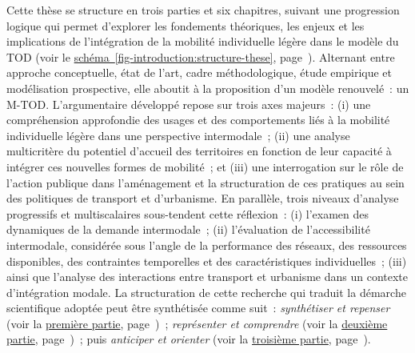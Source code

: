 \begin{refsegment}
Cette thèse se structure en trois parties et six chapitres, suivant une progression logique qui permet d’explorer les fondements théoriques, les enjeux et les implications de l’intégration de la mobilité individuelle légère dans le modèle du \acrshort{TOD} (voir le \hyperref[fig-introduction:structure-these]{schéma~\ref{fig-introduction:structure-these}}, page~\pageref{fig-introduction:structure-these}). Alternant entre approche conceptuelle, état de l’art, cadre méthodologique, étude empirique et modélisation prospective, elle aboutit à la proposition d’un modèle renouvelé~: un \acrfull{M-TOD}. L’argumentaire développé repose sur trois axes majeurs~: (i) une compréhension approfondie des usages et des comportements liés à la mobilité individuelle légère dans une perspective intermodale~; (ii) une analyse multicritère du potentiel d’accueil des territoires en fonction de leur capacité à intégrer ces nouvelles formes de mobilité~; et (iii) une interrogation sur le rôle de l’action publique dans l’aménagement et la structuration de ces pratiques au sein des politiques de transport et d’urbanisme. En parallèle, trois niveaux d’analyse progressifs et multiscalaires sous-tendent cette réflexion~: (i) l’examen des dynamiques de la demande intermodale~; (ii) l’évaluation de l’accessibilité intermodale, considérée sous l’angle de la performance des réseaux, des ressources disponibles, des contraintes temporelles et des caractéristiques individuelles~; (iii) ainsi que l’analyse des interactions entre transport et urbanisme dans un contexte d'intégration modale. La structuration de cette recherche qui traduit la démarche scientifique adoptée peut être synthétisée comme suit~: \textsl{synthétiser et repenser} (voir la \hyperref[part1:titre]{première partie}, page~\pageref{part1:titre})~; \textsl{représenter et comprendre} (voir la \hyperref[part2:titre]{deuxième partie}, page~\pageref{part2:titre})~; puis \textsl{anticiper et orienter} (voir la \hyperref[part3:titre]{troisième partie}, page~\pageref{part3:titre}).%


\end{refsegment}
